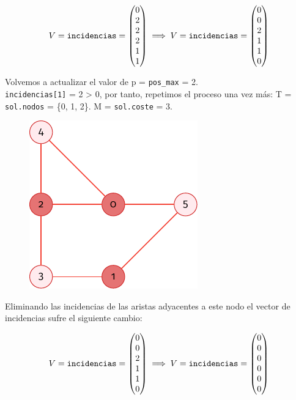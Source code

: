 \documentclass[11pt]{article}
\begin{document}
$$ V = \verb|incidencias| =
\begin{pmatrix}
	0 \\
	2 \\
	2 \\
	2 \\
	1 \\
	1
\end{pmatrix} \implies V = \verb|incidencias| =
\begin{pmatrix}
	0 \\
	0 \\
	2 \\
	1 \\
	1 \\
	0
\end{pmatrix}$$

Volvemos a actualizar el valor de p = \verb|pos_max| = 2.\\
\verb|incidencias[1]| = 2 > 0, por tanto, repetimos el proceso una vez más: T  = \verb|sol.nodos| = \{0, 1, 2\}.
M = \verb|sol.coste| = 3.

\begin{figure}[H]
	\centering \includegraphics{./img/grafo-ejemplo.pdf}
\end{figure}

Eliminando las incidencias de las aristas adyacentes a este nodo el vector de incidencias sufre el siguiente cambio:

 $$ V = \verb|incidencias| =
\begin{pmatrix}
	0 \\
	0 \\
	2 \\
	1 \\
	1 \\
	0
\end{pmatrix} \implies V = \verb|incidencias| =
\begin{pmatrix}
	0 \\
	0 \\
	0 \\
	0 \\
	0 \\
	0
\end{pmatrix}$$
\end{document}
